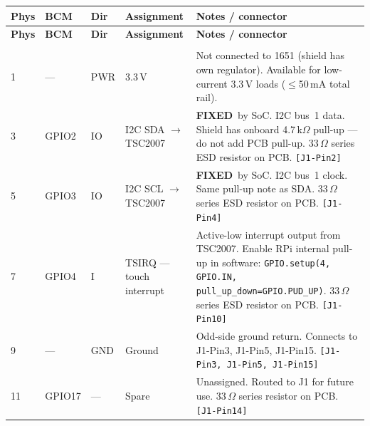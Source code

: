 \documentclass[11pt,a4paper]{article}
\newcommand{\fixed}{\textbf{FIXED}}
\newcommand{\na}{---}
\newcommand{\jref}[1]{\texttt{\small[#1]}}
\begin{document}
\begin{longtable}{C{0.85cm} C{1.2cm} C{0.65cm} L{3.2cm} L{8.1cm}}
  \toprule
  \color{white}\textbf{Phys} &
  \color{white}\textbf{BCM} &
  \color{white}\textbf{Dir} &
  \color{white}\textbf{Assignment} &
  \color{white}\textbf{Notes / connector} \\
  \midrule
  \endfirsthead
  \toprule
  \color{white}\textbf{Phys} &
  \color{white}\textbf{BCM} &
  \color{white}\textbf{Dir} &
  \color{white}\textbf{Assignment} &
  \color{white}\textbf{Notes / connector} \\
  \midrule
  \endhead
  \bottomrule
  \endfoot

   \\
  \midrule

  1 & \na & PWR & 3.3\,V &
    Not connected to 1651 (shield has own regulator).
    Available for low-current 3.3\,V loads ($\leq$50\,mA total rail). \\

  3 & GPIO2 & IO & I2C SDA $\to$ TSC2007 &
    \fixed\ by SoC. I2C bus~1 data.
    Shield has onboard 4.7\,k$\Omega$ pull-up --- do not add PCB pull-up.
    33\,$\Omega$ series ESD resistor on PCB.
    \jref{J1-Pin2} \\

  5 & GPIO3 & IO & I2C SCL $\to$ TSC2007 &
    \fixed\ by SoC. I2C bus~1 clock.
    Same pull-up note as SDA.
    33\,$\Omega$ series ESD resistor on PCB.
    \jref{J1-Pin4} \\

  7 & GPIO4 & I & TSIRQ --- touch interrupt &
    Active-low interrupt output from TSC2007.
    Enable RPi internal pull-up in software:
    \texttt{GPIO.setup(4, GPIO.IN, pull\_up\_down=GPIO.PUD\_UP)}.
    33\,$\Omega$ series ESD resistor on PCB.
    \jref{J1-Pin10} \\

  9 & \na & GND & Ground &
    Odd-side ground return. Connects to J1-Pin3, J1-Pin5, J1-Pin15.
    \jref{J1-Pin3, J1-Pin5, J1-Pin15} \\

  11 & GPIO17 & \na & Spare &
    Unassigned. Routed to J1 for future use.
    33\,$\Omega$ series resistor on PCB.
    \jref{J1-Pin14} \\


\end{longtable}
\end{document}
